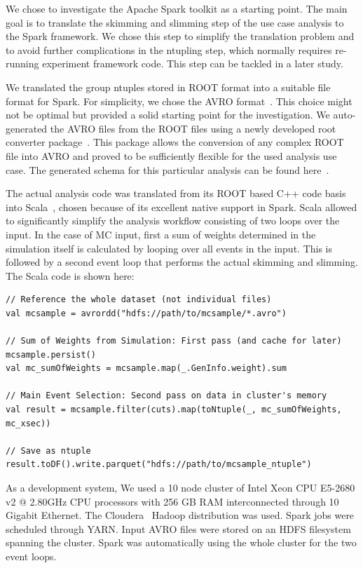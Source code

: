 \documentclass[a4paper]{jpconf}
\begin{document}
We chose to investigate the Apache Spark toolkit as a starting point. The main goal is to translate the skimming and slimming step of the use case analysis to the Spark framework. We chose this step to simplify the translation problem and to avoid further complications in the ntupling step, which normally requires re-running experiment framework code. This step can be tackled in a later study.

We translated the group ntuples stored in ROOT format into a suitable file format for Spark. For simplicity, we chose the AVRO format~\cite{avro}. This choice might not be optimal but provided a solid starting point for the investigation. We auto-generated the AVRO files from the ROOT files using a newly developed root converter package~\cite{rootconverter}. This package allows the conversion of any complex ROOT file into AVRO and proved to be sufficiently flexible for the used analysis use case. The generated schema for this particular analysis can be found here~\cite{avroschema}.

The actual analysis code was translated from its ROOT based C++ code basis into Scala~\cite{scala}, chosen because of its excellent native support in Spark. Scala allowed to significantly simplify the analysis workflow consisting of two loops over the input. In the case of MC input, first a sum of weights determined in the simulation itself is calculated by looping over all events in the input. This is followed by a second event loop that performs the actual skimming and slimming. The Scala code is shown here:

\begin{verbatim}
// Reference the whole dataset (not individual files)
val mcsample = avrordd("hdfs://path/to/mcsample/*.avro")

// Sum of Weights from Simulation: First pass (and cache for later)
mcsample.persist()
val mc_sumOfWeights = mcsample.map(_.GenInfo.weight).sum

// Main Event Selection: Second pass on data in cluster's memory
val result = mcsample.filter(cuts).map(toNtuple(_, mc_sumOfWeights, mc_xsec))

// Save as ntuple
result.toDF().write.parquet("hdfs://path/to/mcsample_ntuple")
\end{verbatim}

As a development system, We used a 10 node cluster of Intel Xeon CPU E5-2680 v2 @ 2.80GHz CPU processors with 256 GB RAM interconnected through 10 Gigabit Ethernet. The Cloudera~\cite{cloudera} Hadoop distribution was used. Spark jobs were scheduled through YARN. Input AVRO files were stored on an HDFS filesystem spanning the cluster. Spark was automatically using the whole cluster for the two event loops.
\end{document}
